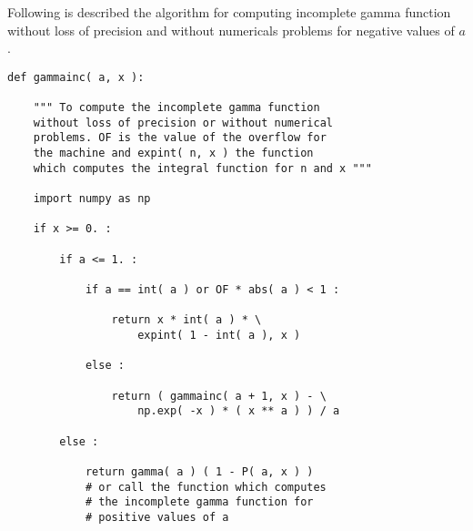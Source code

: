 Following is described the algorithm for computing incomplete gamma function without loss of precision
and without numericals problems for negative values of $a$.


\begin{verbatim}
def gammainc( a, x ):

	""" To compute the incomplete gamma function
	without loss of precision or without numerical
	problems. OF is the value of the overflow for
	the machine and expint( n, x ) the function
	which computes the integral function for n and x """

	import numpy as np

	if x >= 0. :

		if a <= 1. :

			if a == int( a ) or OF * abs( a ) < 1 :

				return x * int( a ) * \
					expint( 1 - int( a ), x )

			else :

				return ( gammainc( a + 1, x ) - \
					np.exp( -x ) * ( x ** a ) ) / a

		else :

			return gamma( a ) ( 1 - P( a, x ) )
			# or call the function which computes
			# the incomplete gamma function for
			# positive values of a
\end{verbatim}
